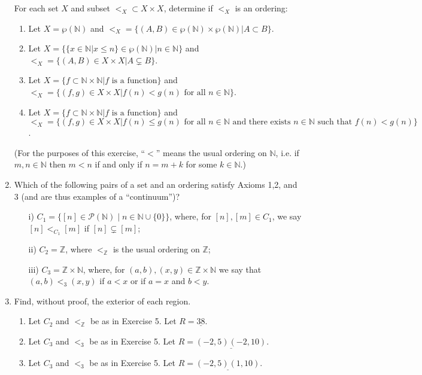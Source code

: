 \documentclass[11pt]{article}
\newcommand{\bbN}{\mathbb{N}}
\newcommand{\bbZ}{\mathbb{Z}}
\renewcommand{\_}[1]{\underline{ #1 }}
\theoremstyle{definition}
\numberwithin{equation}{subsection}
\begin{document}
\begin{enumerate}
For each set $X$ and subset $<_X \subset X\times X$, determine if $<_X$ is an ordering:
\begin{enumerate}
\item Let $X = \wp(\bbN)$ and $<_X = \{(A,B) \in \wp(\bbN)\times\wp(\bbN) | A \subset B\}$.
\item Let $X = \big\{ \{x \in \bbN | x \leq n\} \in \wp(\bbN) | n \in \bbN \big\}$ and $<_X = \{ (A, B)\in X\times X | A \subsetneq B\}$.
\item Let $X = \{ f \subset \bbN \times \bbN | f \text{ is a function}\}$ and $<_X = \{ (f,g) \in X\times X | f(n) < g(n) \text{ for all }n\in\bbN\}$.
\item Let $X = \{ f \subset \bbN \times \bbN | f \text{ is a function}\}$ and $<_X = \{ (f,g) \in X\times X | f(n) \leq g(n) \text{ for all }n\in\bbN \text{ and there exists } n\in\bbN \text{ such that } f(n) < g(n)\}$.
\end{enumerate}
(For the purposes of this exercise, ``$<$'' means the usual ordering on $\bbN$, i.e. if $m,n\in\bbN$ then $m < n$ if and only if $n = m+k$ for some $k\in\bbN$.)

\item
	Which of the following pairs of a set and an ordering satisfy Axioms 1,2, and 3 (and are thus examples of a ``continuum'')?
	\begin{enumerate}
		\item[i)] $C_1 = \{[n] \in \mathcal{P}(\bbN) \mid n \in \bbN\cup\{0\}\}$, where, for $[n], [m] \in C_1$, we say $[n] <_{C_1} [m]$ if $[n] \subsetneq [m]$;
		\item[ii)] $C_2 = \bbZ$, where $<_\bbZ$ is the usual ordering on $\bbZ$;
		\item[iii)] $C_3 = \bbZ\times \bbN$, where, for $(a,b), (x,y) \in \bbZ\times\bbN$ we say that $(a,b) <_3 (x,y)$ if $a < x$ or if $a=x$ and $b < y$.
	\end{enumerate}


\item
		Find, without proof, the exterior of each region.
		\begin{enumerate}
			\item Let $C_2$ and $<_\bbZ$ be as in Exercise 5.  Let $R = \underline{38}$.
			\item Let $C_3$ and $<_3$ be as in Exercise 5.  Let $R = \underline{(-2,5)(-2,10)}$.
			\item Let $C_3$ and $<_3$ be as in Exercise 5.  Let $R = \underline{(-2,5)(1,10)}$.
		\end{enumerate}




\end{enumerate}
\end{document}
